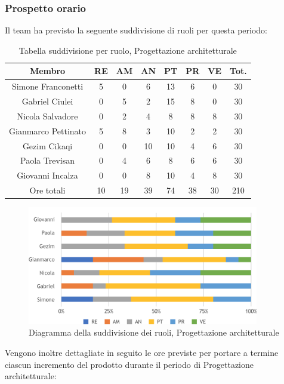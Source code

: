 \subsubsection{Prospetto orario}
Il team ha previsto la seguente suddivisione di ruoli per questa periodo:
\\
\begin{table}[h]
\caption{Tabella suddivisione per ruolo, Progettazione architetturale}  
\begin{center}
\begin{tabular}{ |c|c|c|c|c|c|c|c|  }
 \hline
 Membro 		& RE 	& AM 	& AN 	& PT 	& PR 	& VE 	& Tot.\\
 \hline\hline
 Simone	Franconetti		& 5 		& 0		& 6 	& 13 	& 6 		& 0 		& 30\\
 Gabriel Ciulei		& 0 		& 5 		& 2 	& 15		& 8 		& 0 		& 30\\
 Nicola	Salvadore		& 0 		& 2 		& 4 	& 8		& 8 		& 8 		& 30\\
 Gianmarco	Pettinato	& 5 		& 8 		& 3 	& 10 	& 2 		& 2 		& 30\\
 Gezim	Cikaqi		& 0 		& 0 		& 10 	& 10		& 4 		& 6	 	& 30\\
 Paola	Trevisan		& 0 		& 4 		& 6 	& 8 		& 6 		& 6 		& 30\\
 Giovanni Incalza		& 0 		& 0	 	& 8 	& 10		& 4 		& 8  	& 30\\
 \hline\hline
 Ore totali		& 10		& 19		& 39 	& 74	 	& 38 	& 30 	& 210\\
  \hline
\end{tabular}
\end{center}
\end{table}
\begin{figure}[h!]
	\includegraphics[width=0.9\textwidth]{res/img/hi336}
	\caption{Diagramma della suddivisione dei ruoli, Progettazione architetturale}
\end{figure}

\noindent Vengono inoltre dettagliate in seguito le ore previste per portare a termine ciascun incremento del prodotto durante il periodo di Progettazione architetturale:

